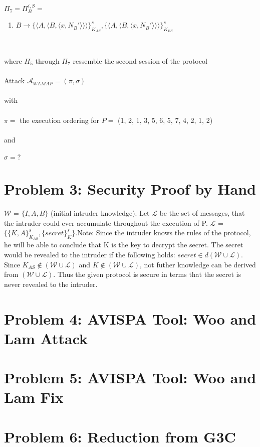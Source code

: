 \documentclass[12pt,pdftex,a4paper]{article}
\newcommand\tab[1][1cm]{\hspace*{#1}}
\begin{document}
$\Pi_7 = \Pi_B^{i,S} =$
\begin{enumerate}
\item \tab $ B \rightarrow \{\langle A, \langle B, \langle x, N_B' \rangle\rangle\rangle\}_{K_{AS}}^s, \{\langle A, \langle B, \langle x, N_B' \rangle\rangle\rangle\}_{K_{BS}}^s $
\end{enumerate}\

where $\Pi_5$ through $\Pi_7$ ressemble the second session of the protocol\\~\\
Attack $\mathcal{A}_{WLMAP} = (\pi, \sigma) $ \\~\\
with\\~\\
$\pi = $ the execution ordering for $ P =$ (1, 2, 1, 3, 5, 6, 5, 7, 4, 2, 1, 2) \\~\\
and \\~\\
$\sigma =? $


\section*{Problem 3: Security Proof by Hand}
$\mathcal{W}$ = $\{I, A, B\}$ (initial intruder knowledge). Let $\mathcal{L}$ be the set of messages, that the intruder could ever accumulate throughout the execution of P. $\mathcal{L}$ = $\{\{K, A\}_{K_{AS}}^s, \{secret\}_K^s\}$.\newline Note: Since the intruder knows the rules of the protocol, he will be able to conclude that K is the key to decrypt the secret.\newline
The secret would be revealed to the intruder if the following holds: $secret\in d(\mathcal{W}\cup\mathcal{L})$. Since $K_{AS} \notin (\mathcal{W}\cup\mathcal{L})$ and $K \notin (\mathcal{W}\cup\mathcal{L})$, not futher knowledge can be derived from $(\mathcal{W}\cup\mathcal{L})$. Thus the given protocol is secure in terms that the secret is never revealed to the intruder.

\section*{Problem 4: AVISPA Tool: Woo and Lam Attack}

\section*{Problem 5: AVISPA Tool: Woo and Lam Fix}

\section*{Problem 6: Reduction from G3C}
\end{document}
